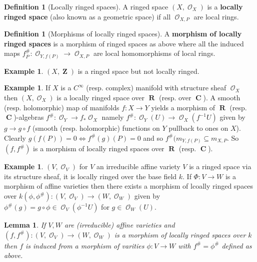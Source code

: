 \documentclass[10pt,]{book}
\newcommand{\terminology}[1]{\textbf{#1}}
\theoremstyle{plain}
\newtheorem{lemma}[theorem]{Lemma}
\theoremstyle{definition}
\newtheorem{definition}[theorem]{Definition}
\newtheorem{example}[theorem]{Example}
\DeclareMathOperator{\CC}{\mathbf{C}}
\DeclareMathOperator{\RR}{\mathbf{R}}
\DeclareMathOperator{\ZZ}{\mathbf{Z}}
\DeclareMathOperator{\cO}{\mathcal{O}}
\begin{document}
\begin{definition}[Locally ringed spaces]\label{definition-11}
A ringed space \((X, \cO_X)\) is a \terminology{locally ringed space} (also known as a geometric space) if all \(\cO_{X,P}\) are local rings.\end{definition}
\begin{definition}[Morphisms of locally ringed spaces]\label{definition-12}
A \terminology{morphism of locally ringed spaces} is a morphism of ringed spaces as above where all the induced maps \(f_P^\#\colon \cO_{Y,f(P)} \to \cO_{X,P}\) are local homomorphisms of local rings.\end{definition}
\begin{example}\label{example-7}
\((X,\ZZ)\) is a ringed space but not locally ringed.\end{example}
\begin{example}\label{example-8}
If \(X\) is a \(C^\infty\) (resp. complex) manifold with structure sheaf \(\cO_X\) then \((X, \cO_X)\) is a locally ringed space over \(\RR\) (resp. over \(\CC\)).
            A smooth (resp. holomorphic) map of manifolds \(f\colon X\to Y\) yields a morphism of \(\RR\) (resp. \(\CC\))-algebras \(f^\#\colon \cO_Y\to f_* \cO_X\) namely \(f^\#\colon\cO_Y(U) \to\cO_X(f^{-1}U)\) given by \(g\to g\circ f\) (smooth (resp. holomorphic) functions on \(Y\) pullback to ones on \(X\)).
            Clearly \(g(f(P)) = 0 \iff f^\#(g)(P) = 0\) and so \(f^\#(m_{Y,f(P)} \subseteq m_{X,P}\).
            So \((f,f^\#)\) is a morphism of locally ringed spaces over \(\RR\) (resp. \(\CC\)).
          \end{example}
\begin{example}\label{example-9}
\((V,\cO_V)\) for \(V\) an irreducible affine variety \(V\) is a ringed space via its structure sheaf, it is locally ringed over the base field \(k\).
            If \(\Phi\colon V \to W\) is a morphism of affine varieties then there exists a morphism of lcoally ringed spaces over \(k\)\((\phi, \phi^\#)\colon (V, \cO_V) \to (W, \cO_W)\) given by \(\phi^\#(g) = g\circ \phi \in \cO_V(\phi^{-1}U)\) for \(g\in\cO_W(U)\).
          \end{example}
\begin{lemma}\label{lemma-2}
If \(V,W\) are (irreducible) affine varieties and \((f,f^\#)\colon (V,\cO_V)\to (W,\cO_W)\) is a morphism of locally ringed spaces over \(k\) then \(f\) is induced from a morphism of varities \(\phi\colon V\to W\) with \(f^\# = \phi^\#\) defined as above.\end{lemma}
\end{document}
